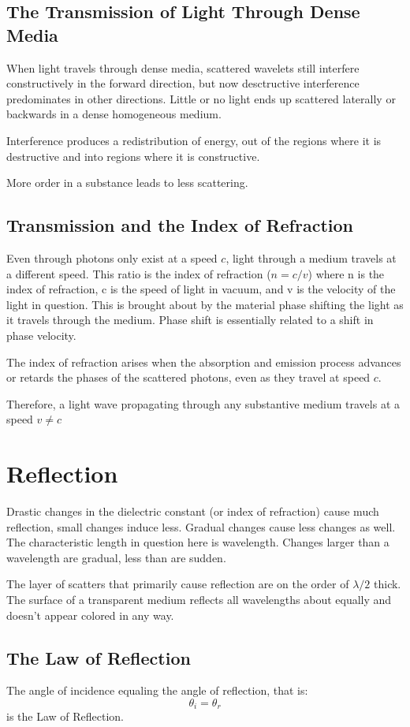 \documentclass[12pt]{report}
\begin{document}
\subsection{The Transmission of Light Through Dense Media}
When light travels through dense media, scattered wavelets still interfere constructively in the forward direction, but now desctructive interference predominates in other directions. Little or no  light ends up scattered laterally or backwards in a dense homogeneous medium. 

Interference produces a redistribution of energy, out of the regions where it is destructive and into regions where it is constructive. 

More order in a substance leads to less scattering. 
\subsection{Transmission and the Index of Refraction}
Even through photons only exist at a speed $c$, light through a medium travels at a different speed. This ratio is the index of refraction ($n = c/v$) where n is the index of refraction, c is the speed of light in vacuum, and v is the velocity of the light in question. This is brought about by the material phase shifting the light as it travels through the medium. Phase shift is essentially related to a shift in phase velocity. 

The index of refraction arises when the absorption and emission process advances or retards the phases of the scattered photons, even as they travel at speed $c$.

Therefore, a light wave propagating through any substantive medium travels at a speed $v \neq c$

\section{Reflection}
Drastic changes in the dielectric constant (or index of refraction) cause much reflection, small changes induce less. Gradual changes cause less changes as well. The characteristic length in question here is wavelength. Changes larger than a wavelength are gradual, less than are sudden. 

The layer of scatters that primarily cause reflection are on the order of $\lambda/2$ thick. The surface of a transparent medium reflects all wavelengths about equally and doesn't appear colored in any way. 

\subsection{The Law of Reflection}
The angle of incidence equaling the angle of reflection, that is:
\begin{equation}
\theta_i = \theta_r
\end{equation}
is the Law of Reflection. 
\end{document}
